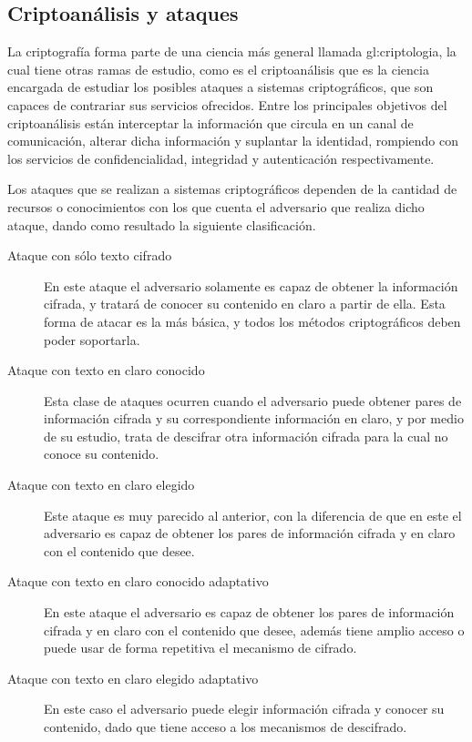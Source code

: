 %
%

\subsection{Criptoanálisis y ataques}
\label{sec:criptoanalisis}

La criptografía forma parte de una ciencia más general llamada
\gls{gl:criptologia}, la cual tiene otras ramas de estudio, como es el
criptoanálisis que es la ciencia encargada de estudiar los posibles ataques a
sistemas criptográficos, que son capaces de contrariar sus servicios
ofrecidos. Entre los principales objetivos del criptoanálisis están
interceptar la información que circula en un canal de comunicación, alterar
dicha información y suplantar la identidad, rompiendo con los servicios de
confidencialidad, integridad y autenticación respectivamente.

Los ataques que se realizan a sistemas criptográficos dependen de la cantidad
de recursos o conocimientos con los que cuenta el adversario que realiza dicho
ataque, dando como resultado la siguiente clasificación.

\begin{description}

  \item[Ataque con sólo texto cifrado]
    En este ataque el adversario solamente es capaz de obtener la información
    cifrada, y tratará de conocer su contenido en claro a partir de ella.
    Esta forma de atacar es la más básica, y todos los métodos
    criptográficos deben poder soportarla.

  \item[Ataque con texto en claro conocido]
    Esta clase de ataques ocurren cuando el adversario puede obtener pares
    de información cifrada y su correspondiente información en claro, y
    por medio de su estudio, trata de descifrar otra información cifrada
    para la cual no conoce su contenido.

  \item[Ataque con texto en claro elegido]
    Este ataque es muy parecido al anterior, con la diferencia de que en
    este el adversario es capaz de obtener los pares de información
    cifrada y en claro con el contenido que desee.

  \item[Ataque con texto en claro conocido adaptativo]
    En este ataque el adversario es capaz de obtener los pares de
    información cifrada y en claro con el contenido que desee, además
    tiene amplio acceso o puede usar de forma repetitiva el mecanismo de
    cifrado.

  \item[Ataque con texto en claro elegido adaptativo]
    En este caso el adversario puede elegir información cifrada y conocer
    su contenido, dado que tiene acceso a los mecanismos de descifrado.

\end{description}
